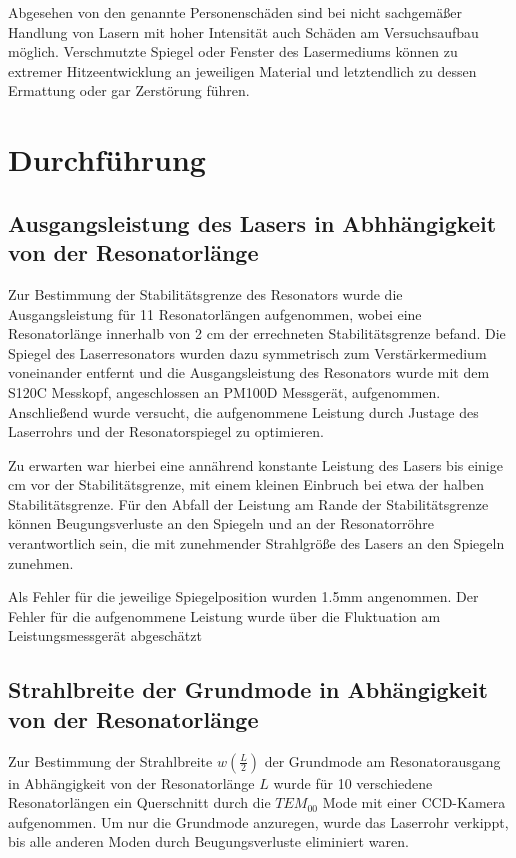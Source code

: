 \documentclass[bigchapter,colorback,accentcolor=tud4b,linedtoc,11pt]{tudreport}
\numberwithin{equation}{subsection}
\begin{document}
Abgesehen von den genannte Personenschäden sind bei nicht sachgemäßer Handlung von Lasern mit hoher Intensität auch Schäden am Versuchsaufbau möglich. Verschmutzte Spiegel oder Fenster des Lasermediums können zu extremer Hitzeentwicklung an jeweiligen Material und letztendlich zu dessen Ermattung oder gar Zerstörung führen.
\cite{GefahrenLaser}
\chapter{Durchführung}
\section{Ausgangsleistung des Lasers in Abhhängigkeit von der Resonatorlänge}
Zur Bestimmung der Stabilitätsgrenze des Resonators wurde die Ausgangsleistung für 11 Resonatorlängen aufgenommen, wobei eine Resonatorlänge innerhalb von 2 cm der errechneten Stabilitätsgrenze befand.
Die Spiegel des Laserresonators wurden dazu symmetrisch zum Verstärkermedium voneinander entfernt und die Ausgangsleistung des Resonators wurde mit dem S120C Messkopf, angeschlossen an PM100D Messgerät, aufgenommen. Anschließend wurde versucht, die aufgenommene Leistung durch Justage des Laserrohrs und der Resonatorspiegel zu optimieren.

Zu erwarten war hierbei eine annährend konstante Leistung des Lasers bis einige cm vor der Stabilitätsgrenze, mit einem kleinen Einbruch bei etwa der halben Stabilitätsgrenze.
Für den Abfall der Leistung am Rande der Stabilitätsgrenze können Beugungsverluste an den Spiegeln und an der Resonatorröhre verantwortlich sein, die mit zunehmender Strahlgröße des Lasers an den Spiegeln zunehmen.

Als Fehler für die jeweilige Spiegelposition wurden 1.5mm angenommen. Der Fehler für die aufgenommene Leistung wurde über die Fluktuation am Leistungsmessgerät abgeschätzt

\FloatBarrier
\section{Strahlbreite der Grundmode in Abhängigkeit von der Resonatorlänge}
Zur Bestimmung der Strahlbreite \(w\left(\frac{L}{2}\right)\) der Grundmode am Resonatorausgang in Abhängigkeit von der Resonatorlänge \(L\) wurde für 10 verschiedene Resonatorlängen ein Querschnitt durch die $TEM_{00}$ Mode mit einer CCD-Kamera aufgenommen. Um nur die Grundmode anzuregen, wurde das Laserrohr verkippt, bis alle anderen Moden durch Beugungsverluste eliminiert waren.
\end{document}
